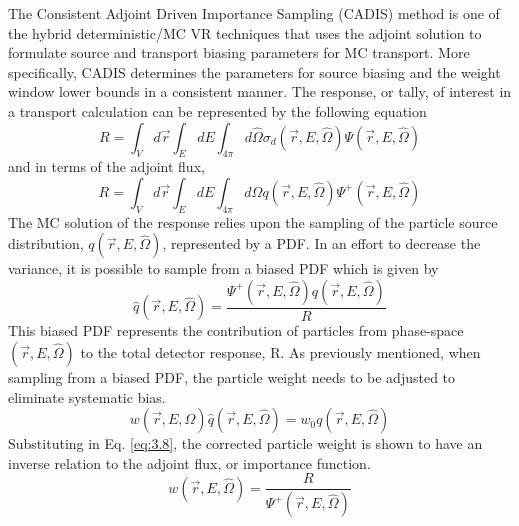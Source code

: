The Consistent Adjoint Driven Importance Sampling (CADIS) method is one of the
hybrid deterministic/MC  VR
techniques that uses the adjoint solution to 
formulate source and transport biasing parameters for MC transport.
More specifically, CADIS determines the parameters for source biasing and the
weight window lower bounds in a consistent manner.
The response, or tally, of interest in a transport calculation can be represented by
the following equation
\begin{equation} \label{eq:3.6}
	R = \int_{V}d\overrightarrow{r} \int_{E} dE
	\int_{4\pi} d\widehat{\Omega}
	\sigma_{d}(\overrightarrow{r}, E, \widehat{\Omega})
	\Psi(\overrightarrow{r}, E, \widehat{\Omega})
\end{equation}
and in terms of the adjoint flux, 
\begin{equation} \label{eq:3.7}
	R = \int_{V}d\overrightarrow{r} \int_{E} dE
	\int_{4\pi} d\widehat{\Omega}
	q(\overrightarrow{r}, E, \widehat{\Omega})
	\Psi^{+}(\overrightarrow{r}, E, \widehat{\Omega})
\end{equation}
The MC solution of the response relies upon the sampling of the particle source
distribution, $q(\overrightarrow{r}, E, \widehat{\Omega})$, represented by a PDF.
In an effort to decrease the variance, it is possible to sample from a biased
PDF which is given by
\begin{equation} \label{eq:3.8}
	\widehat{q}(\overrightarrow{r}, E, \widehat{\Omega}) =
	\frac{\Psi^{+}(\overrightarrow{r}, E,\widehat{\Omega})
	q(\overrightarrow{r}, E, \widehat{\Omega})}{R}
\end{equation}
This biased PDF represents the contribution of particles from phase-space
$(\overrightarrow{r}, E, \widehat{\Omega})$ to the total detector response, R.
As previously mentioned, when sampling from a biased PDF, the particle weight
needs to be adjusted to eliminate systematic bias.  
\begin{equation} \label{eq:3.9}
	w(\overrightarrow{r}, E,
	\widehat{\Omega})\widehat{q}(\overrightarrow{r}, E, \widehat{\Omega})=
	w_{0}q(\overrightarrow{r}, E, \widehat{\Omega})
\end{equation}
Substituting in Eq. \ref{eq:3.8}, the corrected particle weight is shown to have
an inverse relation to the adjoint flux, or importance function.
\begin{equation} \label{eq:3.10}
	w(\overrightarrow{r}, E, \widehat{\Omega})=
	\frac{R}{\Psi^{+}(\overrightarrow{r}, E, \widehat{\Omega})}
\end{equation}
